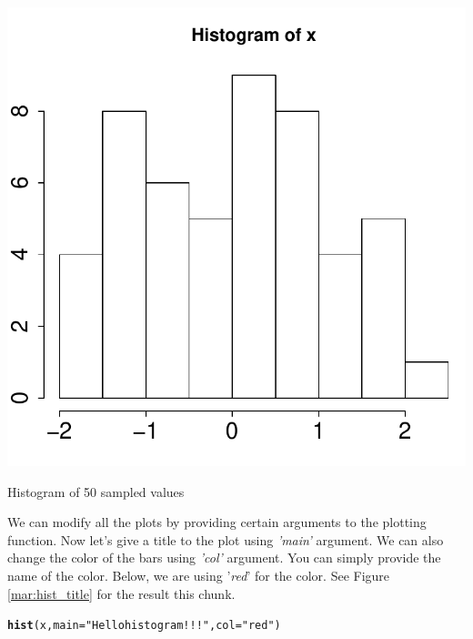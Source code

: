 \documentclass[english,nohyper]{tufte-book}\usepackage[]{graphicx}\usepackage[]{color}
\makeatletter
\newcommand{\hlstr}[1]{\textcolor[rgb]{0.192,0.494,0.8}{#1}}%
\newcommand{\hlstd}[1]{\textcolor[rgb]{0.345,0.345,0.345}{#1}}%
\newcommand{\hlkwc}[1]{\textcolor[rgb]{0.333,0.667,0.333}{#1}}%
\newcommand{\hlkwd}[1]{\textcolor[rgb]{0.737,0.353,0.396}{\textbf{#1}}}%
\newenvironment{kframe}{%
 \def\at@end@of@kframe{}%
 \ifinner\ifhmode%
  \def\at@end@of@kframe{\end{minipage}}%
  \begin{minipage}{\columnwidth}%
 \fi\fi%
 \def\FrameCommand##1{\hskip\@totalleftmargin \hskip-\fboxsep
 \colorbox{shadecolor}{##1}\hskip-\fboxsep
     \hskip-\linewidth \hskip-\@totalleftmargin \hskip\columnwidth}%
 \MakeFramed {\advance\hsize-\width
   \@totalleftmargin\z@ \linewidth\hsize
   \@setminipage}}%
 {\par\unskip\endMakeFramed%
 \at@end@of@kframe}
\newenvironment{knitrout}{}{} %
\makeatother
\begin{document}
\begin{marginfigure}
\begin{knitrout}
\color{fgcolor}

{\centering \includegraphics[width=\linewidth]{figure/graphics-pdf-hist1} 

}



\end{knitrout}

\caption{Histogram of 50 sampled values \label{mar:hist1}}
\end{marginfigure}


\vspace{0.25\textheight}


We can modify all the plots by providing certain arguments to the
plotting function. Now let's give a title to the plot using \emph{'main'}
argument. We can also change the color of the bars using \emph{'col'}
argument. You can simply provide the name of the color. Below, we
are using '\emph{red}' for the color. See Figure \ref{mar:hist_title}
for the result this chunk.

\begin{knitrout}
\color{fgcolor}\begin{kframe}
\begin{alltt}
\hlkwd{hist}\hlstd{(x,} \hlkwc{main} \hlstd{=} \hlstr{"Hello histogram!!!"}\hlstd{,} \hlkwc{col} \hlstd{=} \hlstr{"red"}\hlstd{)}
\end{alltt}
\end{kframe}
\end{knitrout}
\end{document}
